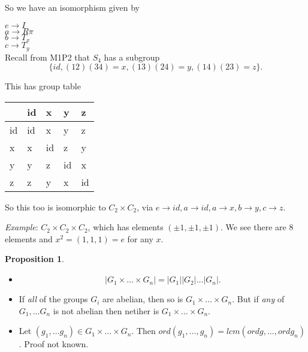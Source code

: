 \documentclass{article}
\theoremstyle{definition}
\newtheorem{proposition}{Proposition}
\begin{document}
So we have an isomorphism given by

$e \rightarrow I$\\
$a \rightarrow R\pi$\\
$b \rightarrow T_x$\\
$c \rightarrow T_y$\\

Recall from M1P2 that $S_4$ has a subgroup $$\{id,  (12)(34)=x, (13)(24)=y, (14)(23)=z\}.$$

This has group table 
\begin{table}[]
\centering
\begin{tabular}{l|llll}
   & id & x  & y  & z \\
   \hline
id & id & x  & y  & z \\
x  & x  & id & z  & y \\
y  & y  & z  & id & x \\
z  & z  & y  & x  & id 
\end{tabular}
\end{table}

So this too is isomorphic to $C_2 \times C_2$, via $e \rightarrow id, a \rightarrow id, a \rightarrow x, b \rightarrow y, c \rightarrow z$.

\emph{Example}: $C_2 \times C_2 \times C_2$, which has elements $(\pm 1, \pm 1, \pm 1)$. We see there are 8 elements and $x^2=(1,1,1)=e$ for any $x$.

\begin{proposition}
\begin{itemize}
\item $$|G_1 \times \ldots \times G_n| =|G_1||G_2|\ldots|G_n|.$$
\item If \emph{all} of the groups $G_i$ are abelian, then so is $G_1 \times \ldots \times G_n$. But if \emph{any} of $G_1, \ldots G_n$ is not abelian then netiher is $G_1 \times \ldots \times G_n$.
\item Let $(g_1, \ldots g_n) \in G_1 \times \ldots \times G_n$. Then $ord (g_1, \ldots , g_n) = lcm (ord g, \ldots , ord g_n)$.
Proof not known.
\end{itemize}
\end{proposition}
\end{document}
